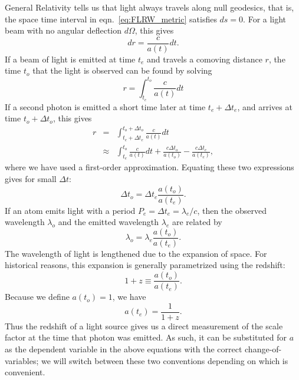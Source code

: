 General Relativity tells us
that light always travels along null geodesics, that is, the space time
interval in eqn.~\ref{eq:FLRW_metric} satisfies $ds = 0$.  For a light
beam with no angular deflection $d\Omega$, this gives
\begin{equation}
  dr = \frac{c}{a(t)} dt.
\end{equation}
If a beam of light is emitted at time $t_e$ and travels
a comoving distance $r$, the
time $t_o$ that the light is observed can be found by solving
\begin{equation}
  r = \int_{t_e}^{t_o} \frac{c}{a(t)} dt
\end{equation}
If a second photon is emitted a short time later at time $t_e + \Delta t_e$,
and arrives at time $t_o + \Delta t_o$, this gives
\begin{eqnarray}
  r &=& 
  \int_{t_e + \Delta t_e}^{t_o + \Delta t_o} \frac{c}{a(t)} dt \nonumber\\
  &\approx& \int_{t_e}^{t_o} \frac{c}{a(t)} dt + \frac{c\Delta t_o}{a(t_o)}
  - \frac{c\Delta t_e}{a(t_e)},
\end{eqnarray}
where we have used a first-order approximation.  Equating these
two expressions gives for small $\Delta t$:
\begin{equation}
  \label{eq:time_dialation}
  \Delta t_o = \Delta t_e \frac{a(t_o)}{a(t_e)}.
\end{equation}
If an atom emits light with a period 
$P_e = \Delta t_e = \lambda_e / c$, then the observed wavelength $\lambda_o$
and the emitted wavelength $\lambda_e$ are related by
\begin{equation}
  \lambda_o = \lambda_e \frac{a(t_o)}{a(t_e)}.
\end{equation}
The wavelength of light is lengthened due to the expansion of space.  For
historical reasons, this expansion is generally parametrized using the
redshift:
\begin{equation}
  1 + z \equiv \frac{a(t_o)}{a(t_e)}.
\end{equation}
Because we define $a(t_o) = 1$, we have
\begin{equation}
  a(t_e) = \frac{1}{1 + z}.
\end{equation}
Thus the redshift of a light source gives us a direct measurement of the
scale factor at the time that photon was emitted.  As such, it can be
substituted for $a$ as the dependent variable in the above equations
with the correct change-of-variables; we will switch between these two
conventions depending on which is convenient.

